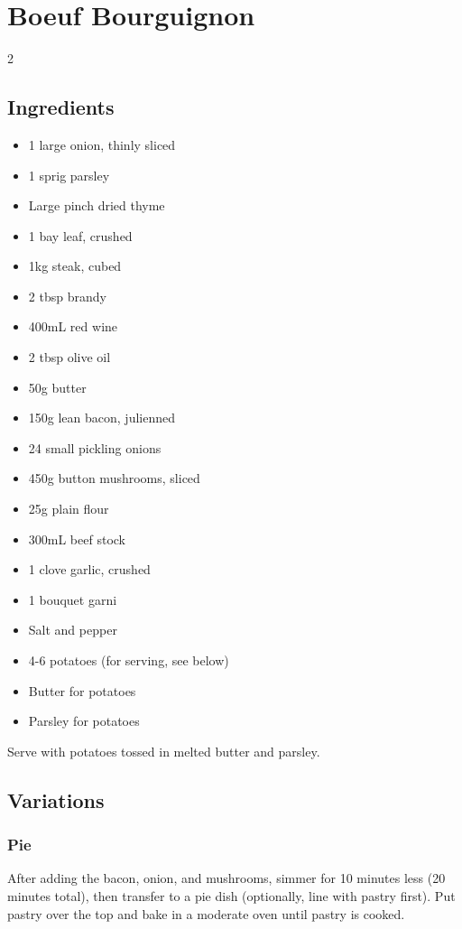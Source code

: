 \clearpage
\section{Boeuf Bourguignon}


  \begin{multicols}{2}
    \subsection{Ingredients}
      \begin{itemize}[noitemsep]
        \item 1 large onion, thinly sliced
        \item 1 sprig parsley
        \item Large pinch dried thyme
        \item 1 bay leaf, crushed
        \item 1kg steak, cubed
        \item 2 tbsp brandy
        \item 400mL red wine
        \item 2 tbsp olive oil
        \item 50g butter
        \item 150g lean bacon, julienned
        \item 24 small pickling onions
        \item 450g button mushrooms, sliced
        \item 25g plain flour
        \item 300mL beef stock
        \item 1 clove garlic, crushed
        \item 1 bouquet garni
        \item Salt and pepper
        \item 4-6 potatoes (for serving, see below)
        \item Butter for potatoes
        \item Parsley for potatoes
      \end{itemize}

      Serve with potatoes tossed in melted butter and parsley.

      \subsection{Variations}
        \subsubsection{Pie}
          After adding the bacon, onion, and mushrooms, simmer for 10 minutes less (20 minutes total), then transfer to a pie dish (optionally, line with pastry first). Put pastry over the top and bake in a moderate oven until pastry is cooked.


\end{multicols}
